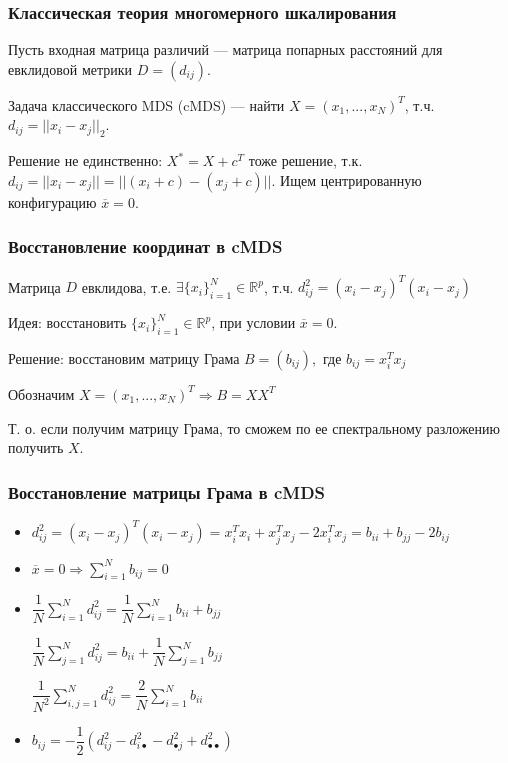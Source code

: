 \documentclass[10pt]{beamer}
\newcommand{\real}{\mathbb{R}}
\begin{document}
\begin{frame}
\frametitle{Классическая теория многомерного шкалирования}

Пусть входная матрица различий --- матрица попарных расстояний для евклидовой метрики $D = (d_{ij})$.

\vspace{\baselineskip}
Задача классического MDS (cMDS) --- найти $X = (x_1, ..., x_N)^T$, т.ч. $d_{ij} = ||x_i - x_j||_2$.

Решение не единственно: $X^* = X + c^T$ тоже решение, т.к. $d_{ij} = ||x_i - x_j|| = ||(x_i + c) - (x_j + c)||$.
Ищем центрированную конфигурацию $\overline{x} = 0$.

\end{frame}

\begin{frame}
\frametitle{Восстановление координат в cMDS}
Матрица $D$ евклидова, т.е. $\exists \{x_i\}_{i=1}^{N} \in \real^p$, т.ч. $d_{ij}^2 = (x_i - x_j)^T(x_i - x_j)$

Идея: восстановить $\{x_i\}_{i=1}^{N} \in \real^p$, при условии $\overline{x} = 0$.

\vspace{\baselineskip}
Решение: восстановим матрицу Грама $B = (b_{ij}),$ где $b_{ij} = x_i^T x_j$

Обозначим $X = (x_1, ..., x_N)^T \Rightarrow B = XX^T$

Т. о. если получим матрицу Грама, то сможем по ее спектральному разложению получить $X$.

\end{frame}

\begin{frame}
\frametitle{Восстановление матрицы Грама в cMDS}
\begin{itemize}

\item{$d_{ij}^2 = (x_i - x_j)^T(x_i - x_j) = x_i^Tx_i + x_j^Tx_j - 2x_i^Tx_j = b_{ii} + b_{jj} - 2b_{ij}$}

\item{$\overline{x} = 0 \Rightarrow \sum_{i=1}^N b_{ij} = 0$}

\item{$\dfrac{1}{N} \sum\limits_{i=1}^{N} d_{ij}^2 = \dfrac{1}{N} \sum\limits_{i=1}^{N} b_{ii} + b_{jj}$

$\dfrac{1}{N} \sum\limits_{j=1}^{N} d_{ij}^2 = b_{ii} + \dfrac{1}{N} \sum\limits_{j=1}^{N} b_{jj}$

$\dfrac{1}{N^2} \sum\limits_{i, j=1}^{N} d_{ij}^2 = \dfrac{2}{N} \sum\limits_{i=1}^{N} b_{ii}$}

\item{$b_{ij} = -\dfrac{1}{2}(d_{ij}^2 - d_{i \bullet}^2 - d_{\bullet j}^2 + d_{\bullet \bullet}^2)$}
\end{itemize}
\end{frame}
\end{document}

